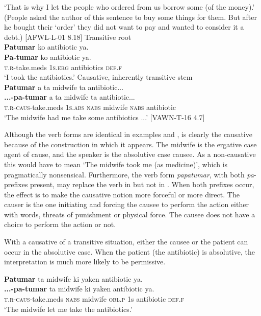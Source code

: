 \glt `That is why I let the people who ordered from us borrow some (of the money).’  (People asked the author of this sentence to buy some things for  them. But after he bought their ‘order’ they did not want to pay and wanted to consider it a debt.) [AFWL-L-01 8.18]
\z
\ea
\label{bkm:Ref362342951}
Transitive root \\
\textbf{Patumar}  ko  antibiotic  ya. \\\smallskip
\gll \textbf{Pa-tumar}  ko  antibiotic  ya. \\
\textsc{t.r}-take.meds  1\textsc{s.erg}  antibiotics  \textsc{def.f} \\
\glt ‘I took the antibiotics.’
\z
\ea
\label{bkm:Ref122954287}
Causative, inherently transitive stem \\
\textbf{Patumar}  a  ta  midwife  ta  antibiotic... \\\smallskip
\gll \textbf{...-pa-tumar}  a  ta  midwife  ta  antibiotic... \\
\textsc{t.r-caus}-take.meds  1\textsc{s.abs}  \textsc{nabs}  midwife  \textsc{nabs}  antibiotic \\
\glt ‘The midwife had me take some antibiotics ...’ [VAWN-T-16 4.7]
\z

Although the verb forms are identical in examples  and ,  is clearly the causative because of the construction in which it appears. The midwife is the ergative case agent of cause, and the speaker is the absolutive case causee. As a non-causative this would have to mean ‘The midwife took me (as medicine)’, which is pragmatically nonsensical. Furthermore, the verb form \textit{papatumar}, with both \textit{pa}{}- prefixes present, may replace the verb in  but not in . When both prefixes occur, the effect is to make the causative notion more forceful or more direct. The causer is the one initiating and forcing the causee to perform the action either with words, threats of punishment or physical force. The causee does not have a choice to perform the action or not.

With a causative of a transitive situation, either the causee  or the patient  can occur in the absolutive case. When the patient (the antibiotic) is absolutive, the interpretation is much more likely to be permissive.

\ea
\label{bkm:Ref389142348}
\textbf{Patumar}  ta  midwife  ki   yaken  antibiotic  ya. \\\smallskip
\gll \textbf{...-pa-tumar}  ta  midwife  ki   yaken  antibiotic  ya. \\
\textsc{t.r-caus}-take.meds  \textsc{nabs}  midwife  \textsc{obl.p}  1s  antibiotic  \textsc{def.f} \\
\glt ‘The midwife let me take the antibiotics.’
\z


